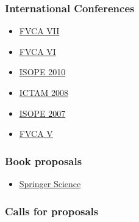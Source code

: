 \documentclass[final, a4paper, oneside, 12pt]{article}
\numberwithin{equation}{section}
\begin{document}
\subsubsection{International Conferences}

  \begin{itemize}
  
    \item \href{http://www.wias-berlin.de/workshops/fvca7/}{FVCA VII}
    
    \item \href{http://fvca6.fs.cvut.cz/}{FVCA VI}
    
    \item \href{http://www.isope2010.org/}{ISOPE 2010}
    
    \item \href{http://ictam2008.adelaide.edu.au/}{ICTAM 2008}
    
    \item \href{http://www.isope.org/conferences/conferences.htm}{ISOPE 2007}
    
    \item \href{http://www.latp.univ-mrs.fr/fvca5/}{FVCA V}
    
  \end{itemize}
  
\subsubsection{Book proposals}

  \begin{itemize}
    \item \href{http://www.springer.com/}{Springer Science}
  \end{itemize}

\subsubsection{Calls for proposals}
\end{document}
